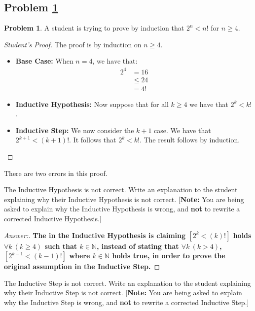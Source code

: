 \documentclass[11pt]{article}
\theoremstyle{definition}
\theoremstyle{definition}
\newtheorem{required}{Problem}
\theoremstyle{definition}
\begin{document}
\subsection{Problem \ref{Induction1}}
\begin{required} \label{Induction1}
A student is trying to prove by induction that $2^{n} < n!$ for $n \geq 4$. 

\begin{proof}[Student's Proof]
The proof is by induction on $n \geq 4$. 
\begin{itemize}
\item \textbf{Base Case:} When $n = 4$, we have that:
\begin{align*}
2^{4} &= 16 \\
&\leq 24 \\
&= 4!
\end{align*}

\item \textbf{Inductive Hypothesis:} Now suppose that for all $k \geq 4$ we have that $2^{k} < k!$. 

\item \textbf{Inductive Step:} We now consider the $k+1$ case. We have that $2^{k+1} < (k+1)!$. It follows that $2^{k} < k!$. The result follows by induction.
\end{itemize}
\end{proof}

There are two errors in this proof. 
\begin{enumerate}[label=(\alph*)]
\item The Inductive Hypothesis is not correct. Write an explanation to the student explaining why their Inductive Hypothesis is not correct. [\textbf{Note:} You are being asked to explain why the Inductive Hypothesis is wrong, and \textbf{not} to rewrite a corrected Inductive Hypothesis.]


\begin{proof}[Answer:]
\item \textbf{The in the Inductive Hypothesis is claiming $[2^{k} < (k)!]$ holds $\forall k\ (k \geq 4)$ such that $k\in\mathbb{N}$, instead of stating that $\forall k\ (k > 4)$, $[2^{k-1} < (k-1)!]$ where $k\in\mathbb{N}$ holds true, in order to prove the original assumption in the Inductive Step.}
\end{proof}


\vskip 15pt
\item The Inductive Step is not correct. Write an explanation to the student explaining why their Inductive Step is not correct. [\textbf{Note:} You are being asked to explain why the Inductive Step is wrong, and \textbf{not} to rewrite a corrected Inductive Step.]


\end{enumerate}
\end{required}
\end{document}
